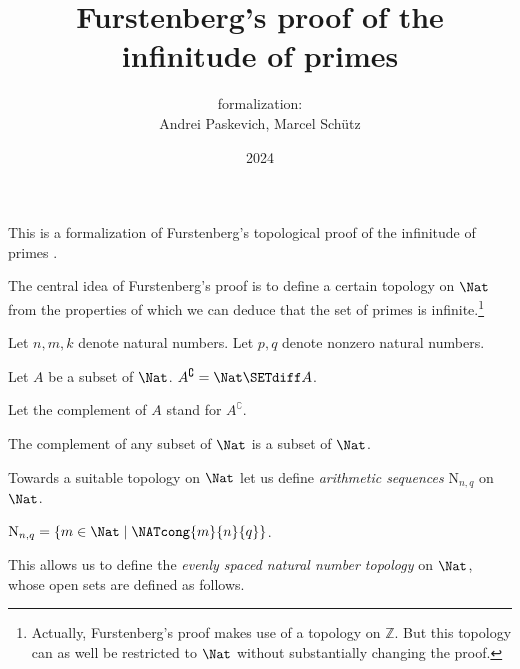 \documentclass{article}
\title{Furstenberg's proof of the infinitude of primes}
\author{\Naproche formalization:\\[0.5em]Andrei Paskevich, Marcel Schütz}
\date{2024}
\newcommand{\N}{\mathrm{N}}
\newcommand{\Int}{\mathbb{Z}}
\begin{document}
  \maketitle


  \noindent This is a formalization of Furstenberg's topological proof of the
  infinitude of primes \cite[p. 353]{Furstenberg1955}.

  The central idea of Furstenberg's proof is to define a certain topology on
  $\Nat$ from the properties of which we can deduce that the set of
  primes is infinite.\footnote{Actually, Furstenberg's proof makes use of a
  topology on $\Int$. But this topology can as well be restricted to
  $\Nat$ without substantially changing the proof.}

  \begin{forthel}
    Let $n, m, k$ denote natural numbers.
    Let $p, q$ denote nonzero natural numbers.

    \begin{definition}
      Let $A$ be a subset of $\Nat$.
      $A^\complement = \Nat \SETdiff A$.
    \end{definition}

    Let the complement of $A$ stand for $A^\complement$.

    \begin{lemma}
      The complement of any subset of $\Nat$ is a subset of $\Nat$.
    \end{lemma}
  \end{forthel}

  Towards a suitable topology on $\Nat$ let us define \textit{arithmetic
  sequences} $\N_{n, q}$ on $\Nat$.

  \begin{forthel}
    \begin{definition}
      $\N_{n, q} = \{ m \in \Nat \mid \NATcong{m}{n}{q} \}$.
    \end{definition}
  \end{forthel}

  This allows us to define the \textit{evenly spaced natural number
  topology} on $\Nat$, whose open sets are defined as follows.
\end{document}
